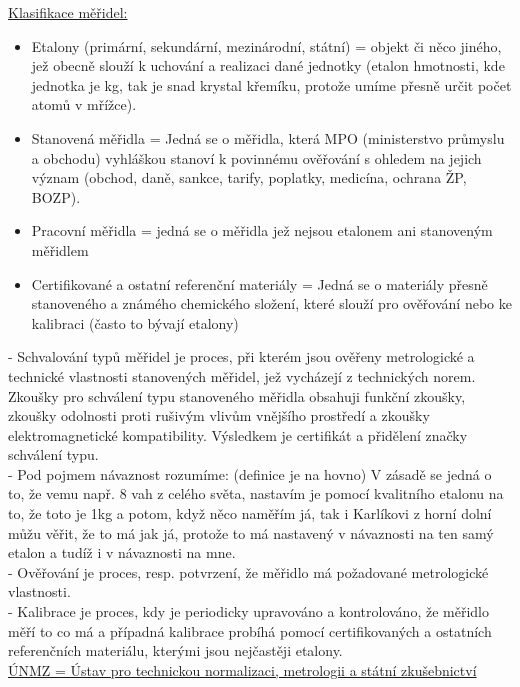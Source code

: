 \underline{Klasifikace měřidel:}
\begin{itemize}
    \item Etalony (primární, sekundární, mezinárodní, státní) = objekt či něco jiného, jež obecně slouží k uchování a realizaci dané jednotky (etalon hmotnosti, kde jednotka je kg, tak je snad krystal křemíku, protože umíme přesně určit počet atomů v mřížce).
    \item Stanovená měřidla = Jedná se o měřidla, která MPO (ministerstvo průmyslu a obchodu) vyhláškou stanoví k povinnému ověřování s ohledem na jejich význam (obchod, daně, sankce, tarify, poplatky, medicína, ochrana ŽP, BOZP).
    \item Pracovní měřidla = jedná se o měřidla jež nejsou etalonem ani stanoveným měřidlem
    \item Certifikované a ostatní referenční materiály = Jedná se o materiály přesně stanoveného a známého chemického složení, které slouží pro ověřování nebo ke kalibraci (často to bývají etalony)
\end{itemize}

- Schvalování typů měřidel je proces, při kterém jsou ověřeny metrologické a technické vlastnosti stanovených měřidel, jež vycházejí z technických norem.
Zkoušky pro schválení typu stanoveného měřidla obsahuji funkční zkoušky, zkoušky odolnosti proti rušivým vlivům vnějšího prostředí a zkoušky elektromagnetické kompatibility. Výsledkem je certifikát a přidělení značky schválení typu.
\\

- Pod pojmem návaznost rozumíme: (definice je na hovno) V zásadě se jedná o to, že vemu např. 8 vah z celého světa, nastavím je pomocí kvalitního etalonu na to, že toto je 1kg a potom, když něco naměřím já, tak i Karlíkovi z horní dolní můžu věřit, že to má jak já, protože to má nastavený v návaznosti na ten samý etalon a tudíž i v návaznosti na mne.
\\

- Ověřování je proces, resp. potvrzení, že měřidlo má požadované metrologické vlastnosti.
\\

- Kalibrace je proces, kdy je periodicky upravováno a kontrolováno, že měřidlo měří to co má a případná kalibrace probíhá pomocí certifikovaných a ostatních referenčních materiálu, kterými jsou nejčastěji etalony.
\\

\underline{ÚNMZ = Ústav pro technickou normalizaci, metrologii a státní zkušebnictví}

